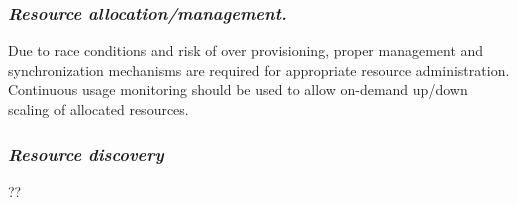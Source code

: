 	
	
	\subsubsection{ \textbf{\emph{Resource allocation/management.}} }Due to race conditions and risk of over provisioning, proper management and synchronization mechanisms are required for appropriate resource administration. Continuous usage monitoring should be used to allow on-demand up/down scaling of allocated resources.  
	 
	
	\subsubsection{ \textbf{\emph{Resource discovery}}} ??
	

